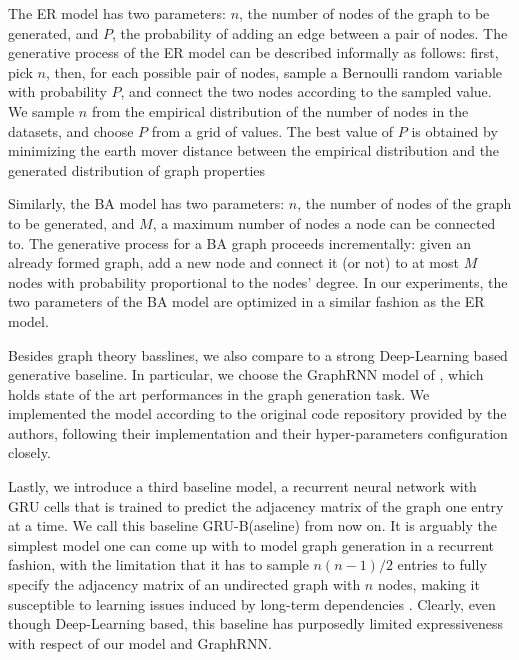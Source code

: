 The ER model has two parameters: $n$, the number of nodes of the graph to be generated, and $P$, the probability of adding an edge between a pair of nodes. The generative process of the ER model can be described informally as follows: first, pick $n$, then, for each possible pair of nodes, sample a Bernoulli random variable with probability $P$, and connect the two nodes according to the sampled value. We sample $n$ from the empirical distribution of the number of nodes in the datasets, and choose $P$ from a grid of values. The best value of $P$ is obtained by minimizing the earth mover distance between the empirical distribution and the generated distribution of graph properties

Similarly, the BA model has two parameters: $n$, the number of nodes of the graph to be generated, and $M$, a maximum number of nodes a node can be connected to. The generative process for a BA graph proceeds incrementally: given an already formed graph, add a new node and connect it (or not) to at most $M$ nodes with probability proportional to the nodes' degree. In our experiments, the two parameters of the BA model are optimized in a similar fashion as the ER model.

Besides graph theory basslines, we also compare to a strong Deep-Learning based generative baseline. In particular, we choose the GraphRNN model of \citet{you2018graphrnn}, which holds state of the art performances in the graph generation task. We implemented the model according to the original code repository provided by the authors, following their implementation and their hyper-parameters configuration closely.

Lastly, we introduce a third baseline model, a recurrent neural network with GRU cells that is trained to predict the adjacency matrix of the graph one entry at a time. We call this baseline GRU-B(aseline) from now on. It is arguably the simplest model one can come up with to model graph generation in a recurrent fashion, with the limitation that it has to sample $n(n-1)/2$ entries to fully specify the adjacency matrix of an undirected graph with $n$ nodes, making it susceptible to learning issues induced by long-term dependencies \citep{bengio1994learninglongtermdependenciesdifficult}. Clearly, even though Deep-Learning based, this baseline has purposedly limited expressiveness with respect of our model and GraphRNN.

